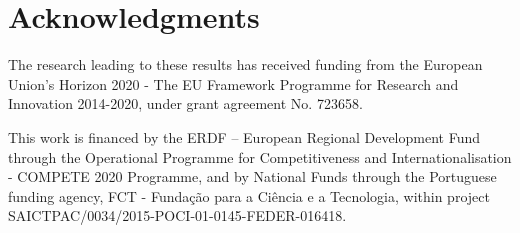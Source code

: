 \section*{Acknowledgments}\label{sec:acknowledgments}

The research leading to these results has received funding from the European Union’s Horizon 2020 - The EU Framework Programme for Research and Innovation 2014-2020, under grant agreement No. 723658.

This work is financed by the ERDF – European Regional Development Fund through the Operational Programme for Competitiveness and Internationalisation - COMPETE 2020 Programme, and by National Funds through the Portuguese funding agency, FCT - Fundação para a Ciência e a Tecnologia, within project SAICTPAC/0034/2015-POCI-01-0145-FEDER-016418.
